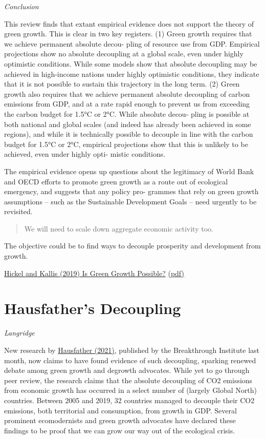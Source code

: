 \documentclass[
]{book}
\begin{document}
\emph{Conclusion}

This review finds that extant empirical evidence does not support the theory of green growth. This
is clear in two key registers. (1) Green growth requires that we achieve permanent absolute decou-
pling of resource use from GDP. Empirical projections show no absolute decoupling at a global
scale, even under highly optimistic conditions. While some models show that absolute decoupling
may be achieved in high-income nations under highly optimistic conditions, they indicate that it is
not possible to sustain this trajectory in the long term. (2) Green growth also requires that we
achieve permanent absolute decoupling of carbon emissions from GDP, and at a rate rapid
enough to prevent us from exceeding the carbon budget for 1.5°C or 2°C. While absolute decou-
pling is possible at both national and global scales (and indeed has already been achieved in
some regions), and while it is technically possible to decouple in line with the carbon budget for
1.5°C or 2°C, empirical projections show that this is unlikely to be achieved, even under highly opti-
mistic conditions.

The empirical evidence opens up questions about the legitimacy of World Bank and OECD efforts
to promote green growth as a route out of ecological emergency, and suggests that any policy pro-
grammes that rely on green growth assumptions -- such as the Sustainable Development Goals --
need urgently to be revisited.

\begin{quote}
We will need to scale down aggregate economic activity too.
\end{quote}

The objective could be to find ways to decouple prosperity and development from growth.

\href{https://doi.org/10.1080/13563467.2019.1598964}{Hickel and Kallis (2019) Is Green Growth Possible?}
\href{pdf/Hickel_and_Kallis_2019_Is_Green_Growth_Possible.pdf}{(pdf)}

\hypertarget{hausfathers-decoupling}{%
\section{Hausfather's Decoupling}\label{hausfathers-decoupling}}

\emph{Langridge}

New research by \href{https://thebreakthrough.org/issues/energy/absolute-decoupling-of-economic-growth-and-emissions-in-32-countries}{Hausfather (2021)}, published by the Breakthrough Institute last month, now claims to have found evidence of such decoupling, sparking renewed debate among green growth and degrowth advocates. While yet to go through peer review, the research claims that the absolute decoupling of CO2 emissions from economic growth has occurred in a select number of (largely Global North) countries. Between 2005 and 2019, 32 countries managed to decouple their CO2 emissions, both territorial and consumption, from growth in GDP. Several prominent ecomodernists and green growth advocates have declared these findings to be proof that we can grow our way out of the ecological crisis.
\end{document}
